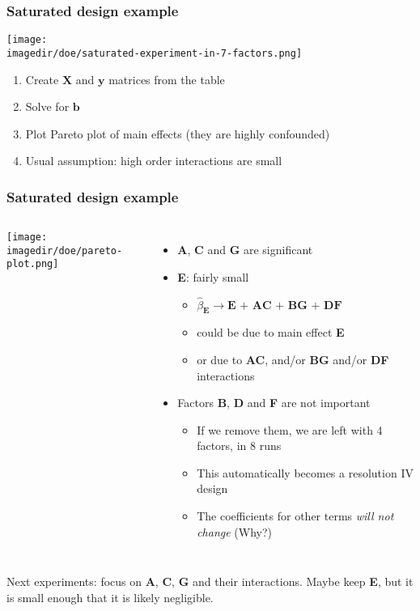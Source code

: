\begin{frame}\frametitle{Saturated design example}
	\begin{center}
		\texttt{[image: \\imagedir/doe/saturated-experiment-in-7-factors.png]}
	\end{center}
	\begin{enumerate}
		\item	Create $\mathbf{X}$ and $\mathbf{y}$ matrices from the table
		\item	Solve for $\mathbf{b}$
		\item	Plot Pareto plot of main effects (they are highly confounded)
		\item	Usual assumption: high order interactions are small
	\end{enumerate}
\end{frame}

\begin{frame}\frametitle{Saturated design example}
	
	\begin{columns}[T]
			\begin{center}
				\texttt{[image: \\imagedir/doe/pareto-plot.png]} 
			\end{center}
			\begin{itemize}
				\item	\textbf{A}, \textbf{C} and \textbf{G} are significant
				\item	\textbf{E}: fairly small 
				\begin{itemize}
					\item	$\widehat{\beta}_{\mathbf{E}} \rightarrow \textbf{E + AC + BG + DF}$ 
					\item	could be due to main effect \textbf{E} 
					\item	or due to \textbf{AC}, and/or \textbf{BG} and/or \textbf{DF} interactions
				\end{itemize}
				\item	Factors \textbf{B}, \textbf{D} and \textbf{F} are not important
				\begin{itemize}
					\item	If we remove them, we are left with 4 factors, in 8 runs
					\item	This automatically becomes a resolution IV design
					\item	The coefficients for other terms \emph{will not change} (Why?)
				\end{itemize}
			\end{itemize}
	\end{columns}
	\vspace{12pt}
	Next experiments: focus on \textbf{A}, \textbf{C}, \textbf{G} and their interactions. Maybe keep \textbf{E}, but it is small enough that it is likely negligible.
\end{frame}

